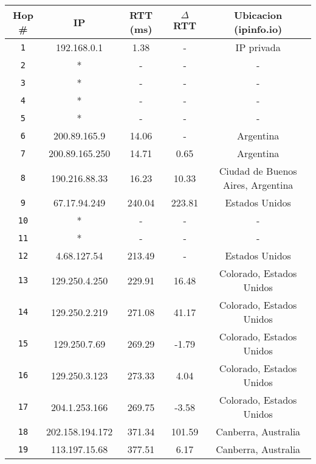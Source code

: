 \begin{table}[ht]\begin{center}
    \begin{tabular}{|c|c|c|c|c|}
    \hline
    \textbf{Hop \#} & \textbf{IP}& \textbf{RTT (ms)} & \textbf{$\Delta$ RTT} & \textbf{Ubicacion (ipinfo.io)} \\ \hline
    \texttt{1} & 192.168.0.1      & 1.38    & -       & IP privada  \\ \hline
    \texttt{2} & *                & -       & -       & -   \\ \hline
    \texttt{3} & *                & -       & -       & -   \\ \hline
    \texttt{4} & *                & -       & -       & -   \\ \hline
    \texttt{5} & *                & -       & -       & -   \\ \hline
    \texttt{6} & 200.89.165.9     & 14.06   & -       & Argentina    \\ \hline
    \texttt{7} & 200.89.165.250   & 14.71    & 0.65   & Argentina   \\ \hline
    \texttt{8} & 190.216.88.33    & 16.23    & 10.33  & Ciudad de Buenos Aires, Argentina   \\ \hline
    \texttt{9} & 67.17.94.249     & 240.04  & 223.81 & Estados Unidos   \\ \hline
    \texttt{10} & *               & -       & -       & -   \\ \hline
    \texttt{11} & *               & -       & -       & -    \\ \hline
    \texttt{12} & 4.68.127.54     & 213.49  & -       & Estados Unidos   \\ \hline
    \texttt{13} & 129.250.4.250   & 229.91  & 16.48    & Colorado, Estados Unidos   \\ \hline
    \texttt{14} & 129.250.2.219   & 271.08  & 41.17   & Colorado, Estados Unidos   \\ \hline
    \texttt{15} & 129.250.7.69    & 269.29  & -1.79   & Colorado, Estados Unidos   \\ \hline
    \texttt{16} & 129.250.3.123   & 273.33  & 4.04    & Colorado, Estados Unidos    \\ \hline
    \texttt{17} & 204.1.253.166   & 269.75  & -3.58   & Colorado, Estados Unidos   \\ \hline
    \texttt{18} & 202.158.194.172 & 371.34  & 101.59   & Canberra, Australia   \\ \hline
    \texttt{19} & 113.197.15.68   & 377.51  & 6.17    & Canberra, Australia   \\ \hline

\end{tabular}
\end{center}
\end{table}
